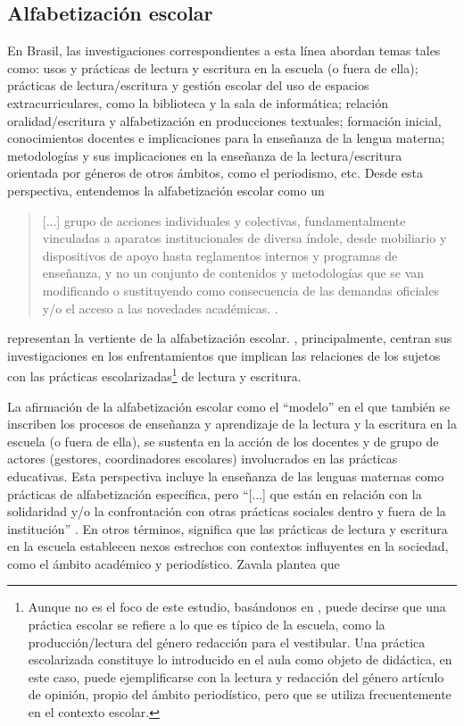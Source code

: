 \documentclass[spanish]{textolivre}
\begin{document}
\subsection{Alfabetización escolar}\label{sec-escolar}
En Brasil, las investigaciones correspondientes a esta línea abordan temas tales como: usos y prácticas de lectura y escritura en la escuela (o fuera de ella); prácticas de lectura/escritura y gestión escolar del uso de espacios extracurriculares, como la biblioteca y la sala de informática; relación oralidad/escritura y alfabetización en producciones textuales; formación inicial, conocimientos docentes e implicaciones para la enseñanza de la lengua materna; metodologías y sus implicaciones en la enseñanza de la lectura/escritura orientada por géneros de otros ámbitos, como el periodismo, etc. Desde esta perspectiva, entendemos la alfabetización escolar como un

\begin{quote}
    [...] grupo de acciones individuales y colectivas, fundamentalmente vinculadas a aparatos institucionales de diversa índole, desde mobiliario y dispositivos de apoyo hasta reglamentos internos y programas de enseñanza, y no un conjunto de contenidos y metodologías que se van modificando o sustituyendo como consecuencia de las demandas oficiales y/o el acceso a las novedades académicas. \cite[p. 323]{signorini_letramento_2007}.
\end{quote}

\textcite{rojo_concepcoes_1995, rojo_letramento_2001, signorini_letramento_2007, bunzen_os_2010} representan la vertiente de la alfabetización escolar. \textcite{signorini_letramento_2007, rojo_letramento_2001}, principalmente, centran sus investigaciones en los enfrentamientos que implican las relaciones de los sujetos con las prácticas escolarizadas\footnote{Aunque no es el foco de este estudio, basándonos en \textcite{rojo_letramento_2001}, puede decirse que una práctica escolar se refiere a lo que es típico de la escuela, como la producción/lectura del género redacción para el vestibular. Una práctica escolarizada constituye lo introducido en el aula como objeto de didáctica, en este caso, puede ejemplificarse con la lectura y redacción del género artículo de opinión, propio del ámbito periodístico, pero que se utiliza frecuentemente en el contexto escolar.} de lectura y escritura.

La afirmación de la alfabetización escolar como el “modelo” en el que también se inscriben los procesos de enseñanza y aprendizaje de la lectura y la escritura en la escuela (o fuera de ella), se sustenta en la acción de los docentes y de grupo de actores (gestores, coordinadores escolares) involucrados en las prácticas educativas. Esta perspectiva incluye la enseñanza de las lenguas maternas como prácticas de alfabetización específica, pero “[...] que están en relación con la solidaridad y/o la confrontación con otras prácticas sociales dentro y fuera de la institución” \cite[p. 323]{signorini_letramento_2007}. En otros términos, significa que las prácticas de lectura y escritura en la escuela establecen nexos estrechos con contextos influyentes en la sociedad, como el ámbito académico y periodístico. Zavala plantea que
\end{document}
